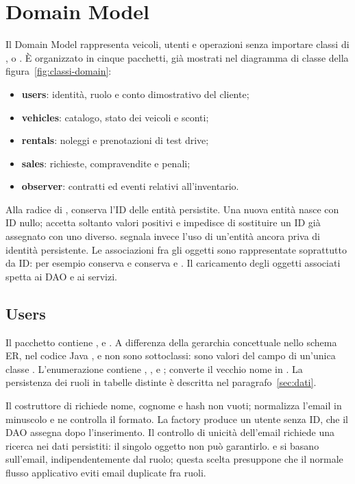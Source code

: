 \section{Domain Model}\label{sec:implementazione-dominio}

Il Domain Model rappresenta veicoli, utenti e operazioni senza importare classi di ,  o . È organizzato in cinque pacchetti, già mostrati nel diagramma di classe della figura~\ref{fig:classi-domain}:
\begin{itemize}
  \item \textbf{users}: identità, ruolo e conto dimostrativo del cliente;
  \item \textbf{vehicles}: catalogo, stato dei veicoli e sconti;
  \item \textbf{rentals}: noleggi e prenotazioni di test drive;
  \item \textbf{sales}: richieste, compravendite e penali;
  \item \textbf{observer}: contratti ed eventi relativi all'inventario.
\end{itemize}
Alla radice di ,  conserva l'ID delle entità persistite. Una nuova entità nasce con ID nullo;  accetta soltanto valori positivi e impedisce di sostituire un ID già assegnato con uno diverso.  segnala invece l'uso di un'entità ancora priva di identità persistente. Le associazioni fra gli oggetti sono rappresentate soprattutto da ID: per esempio  conserva  e  conserva  e . Il caricamento degli oggetti associati spetta ai DAO e ai servizi.

\subsection{Users}
Il pacchetto  contiene ,  e . A differenza della gerarchia concettuale nello schema ER, nel codice Java ,  e  non sono sottoclassi: sono valori del campo  di un'unica classe . L'enumerazione contiene , ,  e ;  converte il vecchio nome  in . La persistenza dei ruoli in tabelle distinte è descritta nel paragrafo~\ref{sec:dati}.

Il costruttore di  richiede nome, cognome e hash non vuoti; normalizza l'email in minuscolo e ne controlla il formato. La factory  produce un utente senza ID, che il DAO assegna dopo l'inserimento. Il controllo di unicità dell'email richiede una ricerca nei dati persistiti: il singolo oggetto non può garantirlo.  e  si basano sull'email, indipendentemente dal ruolo; questa scelta presuppone che il normale flusso applicativo eviti email duplicate fra ruoli.

